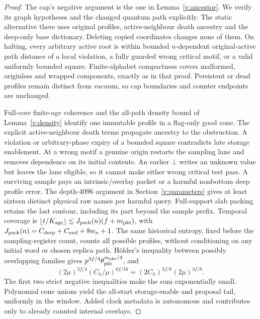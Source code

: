 \begin{proof}
The cap's negative argument is the one in Lemma~\ref{v:ancestor}.
We verify its graph hypotheses and the changed quantum path explicitly.
The static alternative there uses original profiles, active-neighbour
death ancestry and the deep-only base dictionary. Deleting copied
coordinates changes none of them. On halting, every arbitrary active
root is within bounded \(n\)-dependent original-active path distance
of a local violation, a fully guarded wrong critical motif, or a valid
uniformly bounded square. Finite-alphabet compactness covers malformed,
originless and wrapped components, exactly as in that proof. Persistent
or dead profiles remain distinct from vacuum, so cap boundaries and
counter endpoints are unchanged.

Full-core finite-age coherence and the all-path density bound of
Lemma~\ref{v:density} identify one immutable profile in a flag-only
good cone. The explicit active-neighbour death terms propagate ancestry
to the obstruction. A violation or arbitrary-phase expiry of a bounded
square contradicts late storage enablement. At a wrong motif a genuine origin
restarts the sampling lane and removes dependence on its initial contents. An earlier \(\bot\) writes an unknown value but leaves the lane eligible, so it cannot make either wrong critical test pass. A surviving sample pays
an intrinsic/overlay packet or a harmful nonbottom deep profile error.
The depth-4096 argument in Section~\ref{v:parameters} gives at least
sixteen distinct physical raw names per harmful query. Full-support slab
packing retains the last contour, including its part beyond
the sample prefix. Temporal coverage is
\(\lfloor t/K_{\rm age}\rfloor\le J_{\rm pack}(n)(f+m_{\rm pkt})\),
with \(J_{\rm pack}(n)=C_{\rm deep}+C_{\rm end}+8w_n+1\).
The same historical entropy, fixed before the sampling-register count, counts all possible profiles,
without conditioning on any initial word or chosen replica path.
H\"older's inequality between possibly overlapping families gives
\(p^{3f/4}\theta_{\rm pkt}^{m_{\rm pkt}/4}\), and
\[
 (2\mu)^{3f/4}(C_h/\mu)^{6f/16}
       =(2C_h)^{3f/8}(2\mu)^{3f/8}.
\]
The first two strict negative inequalities make the sum exponentially
small. Polynomial cone unions yield the all-start storage-enable and proposal
tail, uniformly in the window. Added clock metadata is autonomous
and contributes only to already counted internal overlays.


\end{proof}
